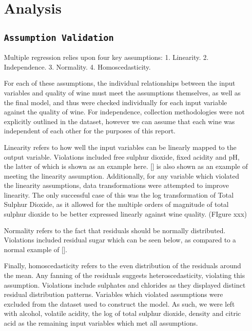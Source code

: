 \documentclass[letterpaper,8pt,twocolumn,twoside,]{pinp}
\begin{document}
\hypertarget{analysis}{%
\section{Analysis}\label{analysis}}

\hypertarget{assumption-validation}{%
\subsection{\texorpdfstring{\texttt{Assumption\ Validation}}{Assumption Validation}}\label{assumption-validation}}

Multiple regression relies upon four key assumptions: 1. Linearity. 2.
Independence. 3. Normality. 4. Homoscedasticity.

For each of these assumptions, the individual relationships between the
input variables and quality of wine must meet the assumptions
themselves, as well as the final model, and thus were checked
individually for each input variable against the quality of wine. For
independence, collection methodologies were not explicitly outlined in
the dataset, however we can assume that each wine was independent of
each other for the purposes of this report.

Linearity refers to how well the input variables can be linearly mapped
to the output variable. Violations included free sulphur dioxide, fixed
acidity and pH, the latter of which is shown as an example here. {[}{]}
is also shown as an example of meeting the linearity assumption.
Additionally, for any variable which violated the linearity assumptions,
data transformations were attempted to improve linearity. The only
successful case of this was the log transformation of Total Sulphur
Dioxide, as it allowed for the multiple orders of magnitude of total
sulphur dioxide to be better expressed linearly against wine quality.
(FIgure xxx)

Normality refers to the fact that residuals should be normally
distributed. Violations included residual sugar which can be seen below,
as compared to a normal example of {[}{]}.

Finally, homoscedasticity refers to the even distribution of the
residuals around the mean. Any fanning of the residuals suggests
heteroscedasticity, violating this assumption. Violations include
sulphates and chlorides as they displayed distinct residual distribution
patterns. Variables which violated assumptions were excluded from the
dataset used to construct the model. As such, we were left with alcohol,
volatile acidity, the log of total sulphur dioxide, density and citric
acid as the remaining input variables which met all assumptions.
\end{document}
